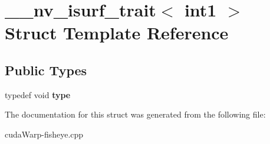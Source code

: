 \hypertarget{struct____nv__isurf__trait_3_01int1_01_4}{}\section{\+\_\+\+\_\+nv\+\_\+isurf\+\_\+trait$<$ int1 $>$ Struct Template Reference}
\label{struct____nv__isurf__trait_3_01int1_01_4}
\subsection*{Public Types}
\begin{DoxyCompactItemize}
\item 
typedef void {\bfseries type}\hypertarget{struct____nv__isurf__trait_3_01int1_01_4_abc69de0225aa1688fd5785b41f9228e8}{}\label{struct____nv__isurf__trait_3_01int1_01_4_abc69de0225aa1688fd5785b41f9228e8}

\end{DoxyCompactItemize}


The documentation for this struct was generated from the following file\+:\begin{DoxyCompactItemize}
\item 
cuda\+Warp-\/fisheye.\+cpp\end{DoxyCompactItemize}
